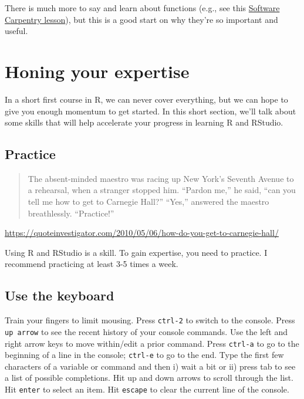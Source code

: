 \documentclass[]{article}
\begin{document}
There is much more to say and learn about functions (e.g., see this
\href{https://swcarpentry.github.io/r-novice-inflammation/02-func-R/index.html}{Software
Carpentry lesson}), but this is a good start on why they're so important
and useful.

\section{Honing your expertise}\label{honing-your-expertise}

In a short first course in R, we can never cover everything, but we can
hope to give you enough momentum to get started. In this short section,
we'll talk about some skills that will help accelerate your progress in
learning R and RStudio.

\subsection{Practice}\label{practice}

\begin{quote}
The absent-minded maestro was racing up New York's Seventh Avenue to a
rehearsal, when a stranger stopped him. ``Pardon me,'' he said, ``can
you tell me how to get to Carnegie Hall?'' ``Yes,'' answered the maestro
breathlessly. ``Practice!''
\end{quote}

\url{https://quoteinvestigator.com/2010/05/06/how-do-you-get-to-carnegie-hall/}

Using R and RStudio is a skill. To gain expertise, you need to practice.
I recommend practicing at least 3-5 times a week.

\subsection{Use the keyboard}\label{use-the-keyboard}

Train your fingers to limit mousing. Press \texttt{ctrl-2} to switch to
the console. Press \texttt{up\ arrow} to see the recent history of your
console commands. Use the left and right arrow keys to move within/edit
a prior command. Press \texttt{ctrl-a} to go to the beginning of a line
in the console; \texttt{ctrl-e} to go to the end. Type the first few
characters of a variable or command and then i) wait a bit or ii) press
tab to see a list of possible completions. Hit up and down arrows to
scroll through the list. Hit \texttt{enter} to select an item. Hit
\texttt{escape} to clear the current line of the console.
\end{document}
